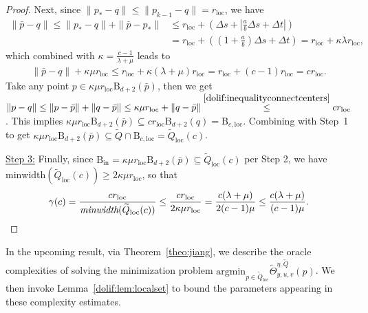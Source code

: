 \documentclass[11pt,letterpaper]{article}
\newcommand{\ball}{\mathrm{B}}
\newcommand{\norm}[1]{\left\lVert #1 \right\rVert}
\newcommand{\local}{\mathrm{loc}}
\newcommand{\Q}{\widetilde{Q}}
\newcommand{\argmin}{\mathrm{argmin}  }
\begin{document}
\begin{proof}
\smallskip

Next, since $\| p_*- q\|\le \| p_{k-1}- q\|=r_\local$, we have
\begin{align*}
\|\bar p- q\|
\le \| p_*- q\|+\|\bar p- p_*\|
&\le r_\local+\left(\Delta s+\left|\frac{a}{b}\Delta s+\Delta t\right|\right)\\
&= r_\local+\left(\left(1+\frac{a}{b}\right)\Delta s+\Delta t\right)
= r_\local+\kappa \lambda r_\local,
\end{align*}
which combined with $\kappa=\frac{c-1}{\lambda+\mu}$ leads to
\begin{align}
\label{dolif:inequalityconnectcenters}
\|\bar p- q\|+\kappa\mu r_\local
\le r_\local+\kappa(\lambda+\mu)r_\local
= r_\local+(c-1)r_\local
= c r_\local. 
\end{align}
Take any point $p\in \kappa\mu r_\local \ball_{d+2}(\bar p)$, then we get $\norm{p- q}\leq \norm{p-\bar p}+\norm{ q-\bar p}\leq  \kappa\mu r_\local+\|q-\bar p\|\stackrel{\eqref{dolif:inequalityconnectcenters}}{\leq} c r_\local$.
This implies $\kappa\mu r_\local \ball_{d+2}(\bar p)\subseteq c r_\local \ball_{d+2}( q)=\ball_{c,\local}$. Combining with Step~1 to get
$\kappa\mu r_\local \ball_{d+2}(\bar p)\subseteq \Q\cap \ball_{c,\local}=\Q_\local(c)$. 

\smallskip
\underline{Step 3:} Finally, since $\ball_{\mathrm{in}}=\kappa\mu r_\local \ball_{d+2}(\bar p)\subseteq \Q_\local(c)$ per Step 2, we have $\mbox{minwidth}(\Q_\local(c))\ge 2\kappa\mu r_\local$,
so that
\[
\gamma(c)=\frac{c r_\local}{\mbox{\em minwidth}(\Q_\local(c))}
\le \frac{c r_\local}{2\kappa\mu r_\local}
= \frac{c(\lambda+\mu)}{2(c-1)\mu}
\le \frac{c(\lambda+\mu)}{(c-1)\mu}.
\]
\end{proof}




In the upcoming result, via Theorem~\ref{theo:jiang}, we describe the oracle complexities of solving the minimization problem $\argmin_{p\in \Q_{\local}} \widetilde{\Theta}^{\eta,\Q}_{y,u,v}(p)$. We then invoke Lemma~\ref{dolif:lem:localset} to bound the parameters appearing in these complexity estimates.
\end{document}
